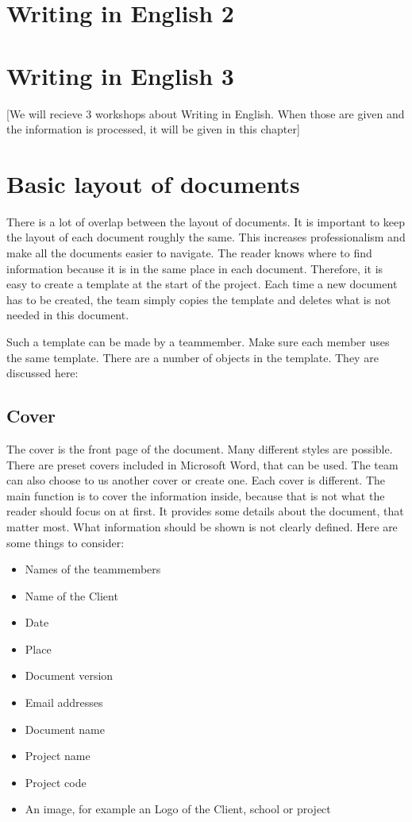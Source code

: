 \documentclass[10pt]{report}
\begin{document}
\section{Writing in English 2}

\section{Writing in English 3}

[We will recieve 3 workshops about Writing in English. When those are given and the information is processed, it will be given in this chapter] 

\newpage

\section{Basic layout of documents}

There is a lot of overlap between the layout of documents. It is important to keep the layout of each document roughly the same. This increases professionalism and make all the documents easier to navigate. The reader knows where to find information because it is in the same place in each document. Therefore, it is easy to create a template at the start of the project. Each time a new document has to be created, the team simply copies the template and deletes what is not needed in this document.

Such a template can be made by a teammember. Make sure each member uses the same template. There are a number of objects in the template. They are discussed here:

\subsection{Cover}

The cover is the front page of the document. Many different styles are possible. There are preset covers included in Microsoft Word, that can be used. The team can also choose to us another cover or create one. Each cover is different. The main function is to cover the information inside, because that is not what the reader should focus on at first. It provides some details about the document, that matter most. What information should be shown is not clearly defined. Here are some things to consider:

\begin{itemize}
	\item Names of the teammembers
	\item Name of the Client
	\item Date
	\item Place
	\item Document version
	\item Email addresses
	\item Document name
	\item Project name
	\item Project code
	\item An image, for example an Logo of the Client, school or project
\end{itemize}
\end{document}
